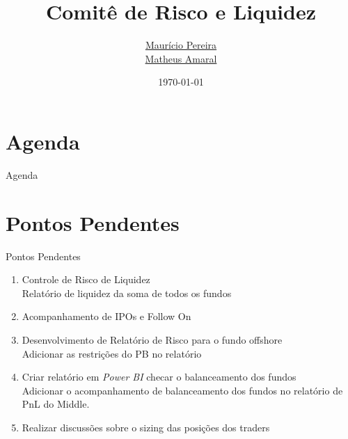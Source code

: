 \documentclass[t,aspectratio=169]{beamer}
\title[Comitê de Risco]{
	Comitê de Risco e Liquidez}
\date{\today}
\author[\href{mailto:risco@asset1.com.br}{risco@asset1.com.br}]{
	\href{mailto:mauricio.pereira@asset1.com.br}{Maurício Pereira}\\
	\vspace{0.12cm}
	\href{mailto:matheus.amaral@asset1.com.br}{Matheus Amaral}
}
\begin{document}

{
	\begin{frame}
		\maketitle
	\end{frame}
}

\section*{Agenda}
\begin{frame}{Agenda}
	\tableofcontents
\end{frame}

\section[Pendências]{Pontos Pendentes}
\begin{frame}{Pontos Pendentes}
	\begin{enumerate}
		\item Controle de Risco de Liquidez\\
		Relatório de liquidez da soma de todos os fundos
		
		\item {\color{blue1}Acompanhamento de IPOs e Follow On}
		
		\item {\color{blue1}Desenvolvimento de Relatório de Risco para o fundo offshore}\\
		Adicionar as restrições do PB no relatório
		
		\item Criar relatório em \emph{Power BI} checar o balanceamento dos fundos\\
		Adicionar o acompanhamento de balanceamento dos fundos no relatório de PnL do Middle.
		
		\item Realizar discussões sobre o sizing das posições dos traders
		
		
	\end{enumerate}
\end{frame}
\end{document}
